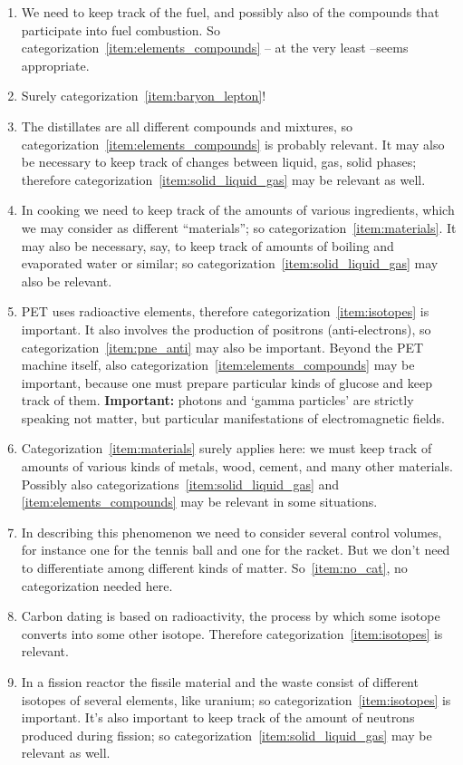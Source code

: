 \documentclass[a4paper,12pt,%
onecolumn,oneside,%
british%
]{memoir}
\renewcommand*{\|}[1][]{\nonscript\:#1\vert\nonscript\:\mathopen{}}
\begin{document}
\begin{enumerate}[exerc]
\item We need to keep track of the fuel, and possibly also of the compounds that participate into fuel combustion. So categorization~\ref{item:elements_compounds} -- at the very least --seems appropriate.
\item Surely categorization~\ref{item:baryon_lepton}!
\item The distillates are all different compounds and mixtures, so categorization~\ref{item:elements_compounds} is probably relevant. It may also be necessary to keep track of changes between liquid, gas, solid phases; therefore categorization~\ref{item:solid_liquid_gas} may be relevant as well.
\item In cooking we need to keep track of the amounts of various ingredients, which we may consider as different \enquote{materials}; so categorization~\ref{item:materials}. It may also be necessary, say, to keep track of amounts of boiling and evaporated water or similar; so categorization~\ref{item:solid_liquid_gas} may also be relevant.
\item PET uses radioactive elements, therefore categorization~\ref{item:isotopes} is important. It also involves the production of positrons (anti-electrons), so categorization~\ref{item:pne_anti} may also be important. Beyond the PET machine itself, also categorization~\ref{item:elements_compounds} may be important, because one must prepare particular kinds of glucose and keep track of them. \textbf{Important:} photons and \enquote*{gamma particles} are strictly speaking not matter, but particular manifestations of electromagnetic fields.
\item Categorization~\ref{item:materials} surely applies here: we must keep track of amounts of various kinds of metals, wood, cement, and many other materials. Possibly also categorizations~\ref{item:solid_liquid_gas} and \ref{item:elements_compounds} may be relevant in some situations.
\item In describing this phenomenon we need to consider several control volumes, for instance one for the tennis ball and one for the racket. But we don't need to differentiate among different kinds of matter. So~\ref{item:no_cat}, no categorization needed here.
\item Carbon dating is based on radioactivity, the process by which some isotope converts into some other isotope. Therefore categorization~\ref{item:isotopes} is relevant.
\item In a fission reactor the fissile material and the waste consist of different isotopes of several elements, like uranium; so categorization~\ref{item:isotopes} is important. It's also important to keep track of the amount of neutrons produced during fission; so categorization~\ref{item:solid_liquid_gas} may be relevant as well.
\end{enumerate}
\end{document}
